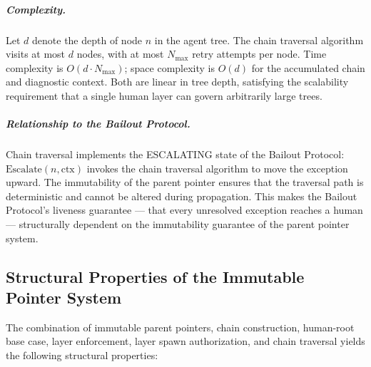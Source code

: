 \subparagraph{Complexity.} Let $d$ denote the depth of node $n$ in the agent tree. The chain traversal algorithm visits at most $d$ nodes, with at most $N_{\max}$ retry attempts per node. Time complexity is $O(d \cdot N_{\max})$; space complexity is $O(d)$ for the accumulated chain and diagnostic context. Both are linear in tree depth, satisfying the scalability requirement that a single human \purpose{} layer can govern arbitrarily large trees.

\subparagraph{Relationship to the Bailout Protocol.} Chain traversal implements the ESCALATING state of the Bailout Protocol: $\text{Escalate}(n, \text{ctx})$ invokes the chain traversal algorithm to move the exception upward. The immutability of the parent pointer ensures that the traversal path is deterministic and cannot be altered during propagation. This makes the Bailout Protocol's liveness guarantee — that every unresolved exception reaches a human — structurally dependent on the immutability guarantee of the parent pointer system.

\subsection{Structural Properties of the Immutable Pointer System}

The combination of immutable parent pointers, chain construction, human-root base case, \fact{} layer enforcement, \purpose{} layer spawn authorization, and chain traversal yields the following structural properties:

